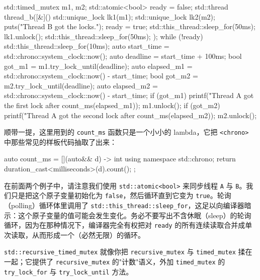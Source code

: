 \begin{codebox}[cpp]
    std::timed_mutex m1, m2;
    std::atomic<bool> ready = false;
    std::thread thread_b([&]() {
      std::unique_lock lk1(m1);
      std::unique_lock lk2(m2);
      puts("Thread B got the locks.");
      ready = true;
      std::this_thread::sleep_for(50ms);
      lk1.unlock();
      std::this_thread::sleep_for(50ms);
    });
    while (!ready) {
      std::this_thread::sleep_for(10ms);
    }
    auto start_time = std::chrono::system_clock::now();
    auto deadline = start_time + 100ms;
    bool got_m1 = m1.try_lock_until(deadline);
    auto elapsed_m1 = std::chrono::system_clock::now() - start_time;
    bool got_m2 = m2.try_lock_until(deadline);
    auto elapsed_m2 = std::chrono::system_clock::now() - start_time;
    if (got_m1) {
      printf("Thread A got the first lock after %
      count_ms(elapsed_m1));
      m1.unlock();
    }
    if (got_m2) {
      printf("Thread A got the second lock after %
      count_ms(elapsed_m2));
      m2.unlock();
    }
\end{codebox}

顺带一提，这里用到的 \texttt{count\_\allowbreak{}ms} 函数只是一个小小的 lambda，它把 \texttt{<chrono>\allowbreak{}} 中那些常见的样板代码抽取了出来：

\begin{codebox}[cpp]
    auto count_ms = [](auto&& d) -> int {
      using namespace std::chrono;
      return duration_cast<milliseconds>(d).count();
    };
\end{codebox}

在前面两个例子中，请注意我们使用 \texttt{std::\allowbreak{}atomic<\allowbreak{}bool>\allowbreak{}} 来同步线程 \texttt{A} 与 \texttt{B}。我们只是把这个原子变量初始化为 \texttt{false}，然后循环直到它变为 \texttt{true}。轮询（polling）循环体里调用了 \texttt{std::\allowbreak{}this\_\allowbreak{}thread::\allowbreak{}sleep\_\allowbreak{}for}，这足以向编译器暗示：这个原子变量的值可能会发生变化。务必不要写出不含休眠（sleep）的轮询循环，因为在那种情况下，编译器完全有权把对 \texttt{ready} 的所有连续读取合并成单次读取，从而形成一个（必然无限）的循环。

\texttt{std::\allowbreak{}recursive\_\allowbreak{}timed\_\allowbreak{}mutex} 就像你把 \texttt{recursive\_\allowbreak{}mutex} 与 \texttt{timed\_\allowbreak{}mutex} 揉在一起；它提供了 \texttt{recursive\_\allowbreak{}mutex} 的"计数"语义，外加 \texttt{timed\_\allowbreak{}mutex} 的 \texttt{try\_\allowbreak{}lock\_\allowbreak{}for} 与 \texttt{try\_\allowbreak{}lock\_\allowbreak{}until} 方法。

